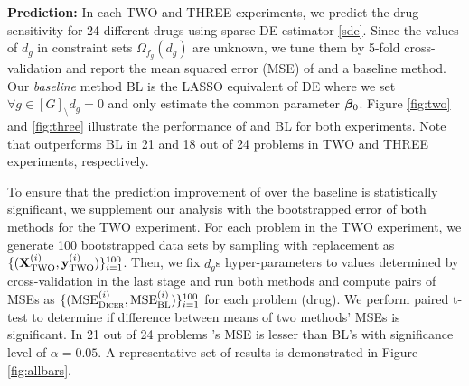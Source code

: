 
{\bf Prediction:} In each TWO and THREE experiments, we predict the drug sensitivity for 24 different drugs using sparse DE estimator \eqref{sde}.  %
Since the values of $d_g$  in constraint sets $\Omega_{f_g}(d_g)$  are unknown, we tune them by 5-fold cross-validation and report the mean squared error (MSE) of \dc{} and a baseline method. 
Our \emph{baseline} method BL is the LASSO \cite{tibs96} equivalent of DE where we set $\forall g \in [G]_\setminus d_g = 0$ and only estimate the common parameter $\boldsymbol{\beta}_0$. 
Figure \ref{fig:two} and \ref{fig:three} illustrate the performance of \dc{} and BL for both experiments. 
Note that \dc{} outperforms BL in 21 and 18 out of 24 problems in TWO and THREE experiments, respectively.

To ensure that the prediction improvement of \dc{} over the baseline is statistically significant, we supplement our analysis with the bootstrapped error of both methods for the TWO experiment.
For each problem in the TWO experiment, we generate 100 bootstrapped data sets by sampling with replacement as $\{(\mathbf{X}^{(i)}_{\text{TWO}}, \mathbf{y}^{(i)}_{\text{TWO}})\}_{i=1}^{100}$.  
Then, we fix $d_g$s hyper-parameters to values determined by cross-validation in the last stage and run both methods and compute pairs of MSEs as $\{(\text{MSE}^{(i)}_{\text{{\sc Dicer}}}, \text{MSE}^{(i)}_{\text{BL}})\}_{i=1}^{100}$ for each problem (drug). We perform paired t-test to determine if difference between means of two methods' MSEs is significant. In 21 out of 24 problems \dc's MSE is lesser than BL's with significance level of $\alpha = 0.05$. A representative set of results is demonstrated in Figure \ref{fig:allbars}. 

	




